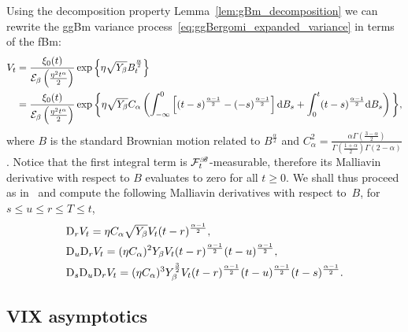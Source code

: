 Using the decomposition property Lemma~\ref{lem:gBm_decomposition} we can rewrite the ggBm variance process~\eqref{eq:ggBergomi_expanded_variance} in terms of the fBm:
\begin{align*}
    V_t &= \frac{\xi_0(t)}{\mathcal{E}_{\beta}\left(\frac{\eta^2 t^\alpha}{2}\right)}\exp\left\{\eta\sqrt{Y_{\beta}} B^{\frac\alpha2}_t\right\} \\
    &= \frac{\xi_0(t)}{\mathcal{E}_{\beta}\left(\frac{\eta^2 t^\alpha}{2}\right)}\exp\bigg\{\eta \sqrt{Y_\beta} C_\alpha \left(
    \int_{-\infty}^{0}
    \left[ (t-s)^{\frac{\alpha-1}{2}} - (-s)^{\frac{\alpha-1}{2}} \right]\mathrm{d} B_s 
    + \int_0^t(t-s)^{\frac{\alpha-1}2}\mathrm{d} B_s\right)\bigg\},
\end{align*}
where $B$ is the standard Brownian motion related to $B^{\frac\alpha2}$ and $C_\alpha^2 = \frac{\alpha \Gamma\left(\frac{3-\alpha}2\right)}{\Gamma\left(\frac{1+\alpha}2\right)\Gamma\left(2-\alpha\right)}$. Notice that the first integral term is $\mathcal{F}^{\mathscr{B}}_t$-measurable, therefore its Malliavin derivative with respect to $B$ evaluates to zero for all $t\geq 0$. We shall thus proceed as in~\cite[Section~5.6]{Alos2021MalliavinFinance} and  compute the following Malliavin derivatives with respect to~$B$, for~$s\leq u\leq r\leq T\leq t$,
\begin{align}\label{eq:malliavin_ggBergomi}
    \begin{split}
    &\mathrm{D}_r V_t = \displaystyle \eta C_{\alpha} \sqrt{Y_\beta} V_t (t-r)^{\frac{\alpha -1}2}, \\ 
    &\mathrm{D}_u \mathrm{D}_r V_t = \displaystyle (\eta C_{\alpha})^2 Y_\beta V_t (t-r)^{\frac{\alpha -1}2}(t-u)^{\frac{\alpha -1}2}, \\
    & \mathrm{D}_s \mathrm{D}_u \mathrm{D}_r V_t = \displaystyle (\eta C_{\alpha})^3 Y_\beta^{\frac32} V_t (t-r)^{\frac{\alpha -1}2}(t-u)^{\frac{\alpha -1}2} (t-s)^{\frac{\alpha -1}2}.
    \end{split}
\end{align}


\subsection{VIX asymptotics}\label{sec:VIX_asymptotics}

